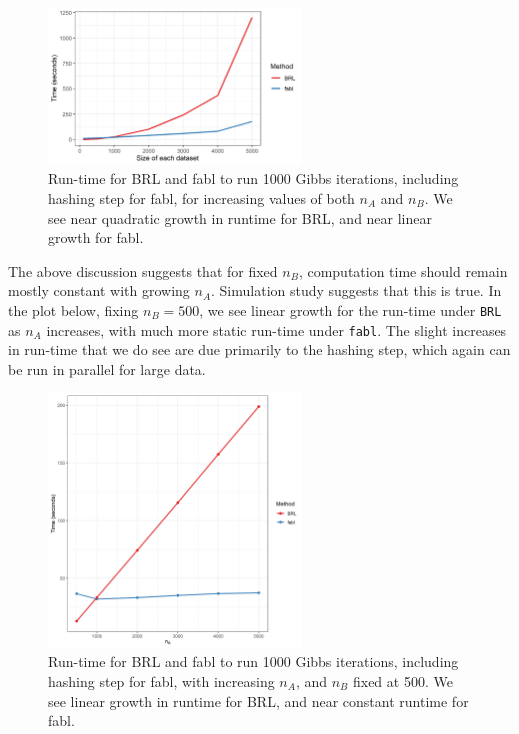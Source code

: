 \documentclass[12pt,letterpaper]{article}
\newcommand{\1}[1]{\mathbb{I}\!\left[#1\right]} %
\begin{document}
\begin{figure}[h!]
	
	{\centering \includegraphics[width=0.6\textwidth]{../notes/figures/sadinle_speed_plot2} 
		
	}
	
	\caption{Run-time for BRL and fabl to run 1000 Gibbs iterations, including hashing step for fabl, for increasing values of both $n_A$ and $n_B$. We see near quadratic growth in runtime for BRL, and near linear growth for fabl.}\label{fig:speed1}
\end{figure}

The above discussion suggests that for fixed \(n_B\), computation time
should remain mostly constant with growing \(n_A\). Simulation study
suggests that this is true. In the plot below, fixing \(n_B = 500\), we
see linear growth for the run-time under \texttt{BRL} as \(n_A\)
increases, with much more static run-time under \texttt{fabl}. The
slight increases in run-time that we do see are due primarily to the
hashing step, which again can be run in parallel for large data.

\begin{figure}[h!]
	
	{\centering \includegraphics[width=0.6\textwidth]{../notes/figures/speed_plot_fixed_nB} 
		
	}
	
	\caption{Run-time for BRL and fabl to run 1000 Gibbs iterations, including hashing step for fabl, with increasing $n_A$, and $n_B$ fixed at 500. We see linear growth in runtime for BRL, and near constant runtime for fabl.}\label{fig:speed2}
\end{figure}
\end{document}
